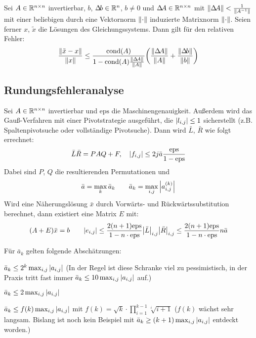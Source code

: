 				Sei \( A \in \mathbb{R}^{n \times n} \) invertierbar, \(b\), \(\Delta\!b \in \mathbb{R}^n\), \(b \neq 0\) und \(\Delta\!A \in \mathbb{R}^{n \times n}\) mit \( \norm{\Delta\!A} < \frac{1}{\norm{A^{-1}}} \) mit einer beliebigen durch eine Vektornorm \( \norm{\cdot} \) induzierte Matrixnorm \( \norm{\cdot} \). Seien ferner \(x\), \(\tilde{x}\) die Lösungen des Gleichungssystems. Dann gilt für den relativen Fehler:
				\begin{equation*}
					\frac{\norm{\tilde{x} - x}}{\norm{x}} \leq \frac{\operatorname{cond}(A)}{1 - \operatorname{cond}(A) \frac{\norm{\Delta\!A}}{\norm{A}}} \bigg( \frac{\norm{\Delta\!A}}{\norm{A}} + \frac{\norm{\Delta\!b}}{\norm{b}} \bigg)
				\end{equation*}

			\subsection{Rundungsfehleranalyse}
				Sei \( A \in \mathbb{R}^{n \times n} \) invertierbar und \( \textrm{eps} \) die Maschinengenauigkeit. Außerdem wird das Gauß-Verfahren mit einer Pivotstrategie ausgeführt, die \( \abs{l_{i,j}} \leq 1 \) sicherstellt (z.B. Spaltenpivotsuche oder vollständige Pivotsuche). Dann wird \( \bar{L} \), \( \bar{R} \) wie folgt errechnet:
				\begin{equation*}
					\bar{L}\bar{R} = PAQ + F, \quad \abs{f_{i,j}} \leq 2 j \bar{a} \frac{\textrm{eps}}{1 - \textrm{eps}}
				\end{equation*}
				Dabei sind \(P\), \(Q\) die resultierenden Permutationen und
				\begin{equation*}
					\bar{a} = \max_k \bar{a}_k \qquad \bar{a}_k = \max_{i,j} \abs{a_{i,j}^{(k)}}
				\end{equation*}
				Wird eine Näherungslösung \( \bar{x} \) durch Vorwärts- und Rückwärtssubstitution berechnet, dann existiert eine Matrix \(E\) mit:
				\begin{equation*}
					(A + E) \bar{x} = b \qquad \abs{e_{i,j}} \leq \frac{2(n + 1) \textrm{eps}}{1 - n \cdot \textrm{eps}} \abs{\bar{L}}_{i,j} \abs{\bar{R}}_{i,j} \leq \frac{2(n + 1) \textrm{eps}}{1 - n \cdot \textrm{eps}} n \bar{a}
				\end{equation*}

				Für \( \bar{a}_k \) gelten folgende Abschätzungen:
				\begin{description}[leftmargin = 5cm]
					\item[Spaltenpivotsuche] \( \bar{a}_k \leq 2^k \max_{i,j} \abs{a_{i,j}} \) (In der Regel ist diese Schranke viel zu pessimistisch, in der Praxis tritt fast immer \( \bar{a}_k \leq 10 \max_{i,j} \abs{a_{i,j}} \) auf.)
					\item[Spaltenpivotsuche (bei Tridiagonalmatrizen)] \( \bar{a}_k \leq 2 \max_{i,j} \abs{a_{i,j}} \)
					\item[Vollständige Pivotsuche] \( \bar{a}_k \leq f(k) \max_{i,j} \abs{a_{i,j}} \) mit \( f(k) = \sqrt{k} \cdot \prod_{i = 1}^{k - 1} \sqrt[i]{i + 1} \) (\(f(k)\) wächst sehr langsam. Bislang ist noch kein Beispiel mit \( \bar{a}_k \geq (k + 1) \max_{i,j} \abs{a_{i,j}} \) entdeckt worden.)
				\end{description}

